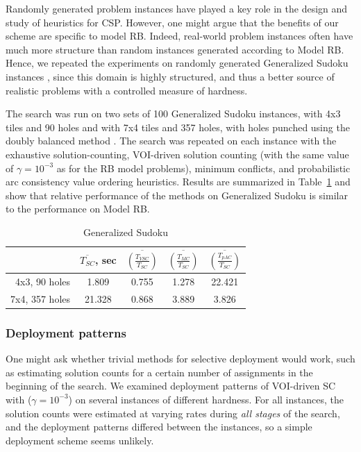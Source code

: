 Randomly generated problem instances have played a key role in the
design and study of heuristics for CSP. However, one might argue that the
benefits of our scheme are specific to model RB. Indeed, real-world problem
instances often have much more structure than random instances
generated according to Model RB. Hence, we repeated the experiments
on randomly generated Generalized Sudoku
instances \cite{Ansotegui.sudoku}, since this domain is highly
structured, and thus a better source of realistic problems with a controlled
measure of hardness.


The search was run on two sets of 100 Generalized Sudoku instances,
with 4x3 tiles and 90 holes and with 7x4 tiles and 357 holes, with
holes punched using the doubly balanced method
\cite{Ansotegui.sudoku}. The search was repeated on each instance with
the exhaustive solution-counting, VOI-driven solution counting (with
the same value of $\gamma=10^{-3}$ as for the RB model problems),
minimum conflicts, and probabilistic arc
consistency value ordering heuristics. Results
are summarized in Table~\ref{tbl:sudoku} and show that relative
performance of the methods on Generalized Sudoku is similar to the
performance on Model RB.
\begin{table}[h]
\begin{center}
\small
\begin{tabular}{r|c|c|c|c}
               & $\overline {T_{SC}}$, sec & $\overline {\left(\frac
                   {T_{VSC}} {T_{SC}}\right)}$ & $\overline
               {\left(\frac {T_{MC}} {T_{SC}}\right)}$ & $\overline
               {\left(\frac {T_{pAC}} {T_{SC}} \right)}$ \\  \hline
4x3, 90 holes &  1.809 & 0.755 & 1.278 & 22.421 \\  \hline
7x4, 357 holes & 21.328 & 0.868 & 3.889 & 3.826
\end{tabular}
\end{center}
\caption{Generalized Sudoku}
\label{tbl:sudoku}
\end{table}

\subsubsection{Deployment patterns}

One might ask whether trivial methods for selective deployment would
work, such as estimating solution counts for a certain number of
assignments in the beginning of the search. We examined deployment
patterns of VOI-driven SC with ($\gamma=10^{-3}$) on several instances
of different hardness. For all instances, the solution counts were
estimated at varying rates during \emph{all stages} of the search, and
the deployment patterns differed between the instances, so a simple
deployment scheme seems unlikely.

